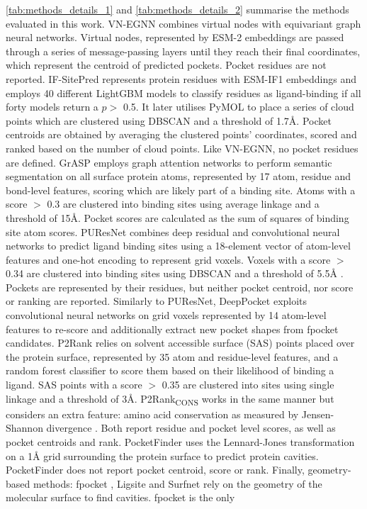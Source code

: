 \autoref{tab:methods_details_1} and \autoref{tab:methods_details_2} summarise the methods evaluated in this work. VN-EGNN \cite{SESTAK_2024_VNEGNN} combines virtual nodes with equivariant graph neural networks. Virtual nodes, represented by ESM-2 embeddings \cite{RIVES_2021_EMBEDDINGS} are passed through a series of message-passing layers until they reach their final coordinates, which represent the centroid of predicted pockets. Pocket residues are not reported. IF-SitePred \cite{CARBERY_2024_IFSP} represents protein residues with ESM-IF1 embeddings \cite{HSU_2022_EMBEDDINGS} and employs 40 different LightGBM models \cite{KE_2017_LIGHTGBM} to classify residues as ligand-binding if all forty models return a $p >$ 0.5. It later utilises PyMOL \cite{SCHRODINGER_2015_PYMOL} to place a series of cloud points which are clustered using DBSCAN \cite{ESTER_1996_DBSCAN}  and a threshold of 1.7\AA{}. Pocket centroids are obtained by averaging the clustered points’ coordinates, scored and ranked based on the number of cloud points. Like VN-EGNN, no pocket residues are defined. GrASP \cite{SMITH_2024_GrASP} employs graph attention networks to perform semantic segmentation on all surface protein atoms, represented by 17 atom, residue and bond-level features, scoring which are likely part of a binding site. Atoms with a score $>$ 0.3 are clustered into binding sites using average linkage and a threshold of 15\AA{}. Pocket scores are calculated as the sum of squares of binding site atom scores. PUResNet \cite{KANDEL_2021_PURESNET} combines deep residual and convolutional neural networks to predict ligand binding sites using a 18-element vector of atom-level features and one-hot encoding to represent grid voxels. Voxels with a score $>$ 0.34 are clustered into binding sites using DBSCAN and a threshold of 5.5\AA{} \cite{KANDEL_2024_PURESNET}. Pockets are represented by their residues, but neither pocket centroid, nor score or ranking are reported. Similarly to PUResNet, DeepPocket \cite{AGGARWAL_2022_DEEPPOCKET} exploits convolutional neural networks on grid voxels represented by 14 atom-level features to re-score and additionally extract new pocket shapes from fpocket candidates. P2Rank \cite{KRIVAK_2018_P2RANK} relies on solvent accessible surface (SAS) points placed over the protein surface, represented by 35 atom and residue-level features, and a random forest classifier to score them based on their likelihood of binding a ligand. SAS points with a score $>$ 0.35 are clustered into sites using single linkage and a threshold of 3\AA{}. P2Rank\textsubscript{CONS} \cite{JENDELE_2019_PRANKWEB} works in the same manner but considers an extra feature: amino acid conservation as measured by Jensen-Shannon divergence \cite{CAPRA_2007_JSD}. Both report residue and pocket level scores, as well as pocket centroids and rank. PocketFinder \cite{AN_2005_POCKETFINDER} uses the Lennard-Jones \cite{JONES_1924_POTENTIAL} transformation on a 1\AA{} grid surrounding the protein surface to predict protein cavities. PocketFinder does not report pocket centroid, score or rank. Finally, geometry-based methods: fpocket \cite{GUILLOUX_2009_FPOCKET}, Ligsite \cite{HENDLICH_1997_LIGSITE} and Surfnet \cite{LASKOWSKI_1995_SURFNET} rely on the geometry of the molecular surface to find cavities. fpocket is the only 